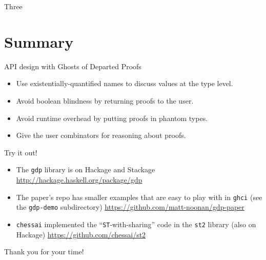 \documentclass{beamer}
\begin{document}
\begin{frame}{Three}

\end{frame}

  \section{Summary}   %
\begin{frame}{API design with Ghosts of Departed Proofs}
  \begin{itemize}
  \item{Use \alert{existentially-quantified names} to discuss values at the type level.}
  \bigskip
  \item{Avoid boolean blindness by \alert{returning proofs to the user}.}
  \bigskip
  \item{Avoid runtime overhead by putting \alert{proofs in phantom types}.}
  \bigskip
  \item{Give the user \alert{combinators for reasoning} about proofs.}
  \end{itemize}

\end{frame}


\begin{frame}{Try it out!}
  \begin{itemize}
  \item{The \texttt{gdp} library is on Hackage and Stackage
    \url{http://hackage.haskell.org/package/gdp}\medskip
  }
  \item{The paper's repo has smaller examples that are easy to play with
    in \texttt{ghci} (see the \texttt{gdp-demo} subdirectory)
    \url{https://github.com/matt-noonan/gdp-paper}\medskip}
  \item{\texttt{chessai} implemented the ``\texttt{ST}-with-sharing'' code
    in the \texttt{st2} library (also on Hackage) \url{https://github.com/chessai/st2}}
  \end{itemize}
  \medskip
  \Large{Thank you for your time!}
\end{frame}
\end{document}
